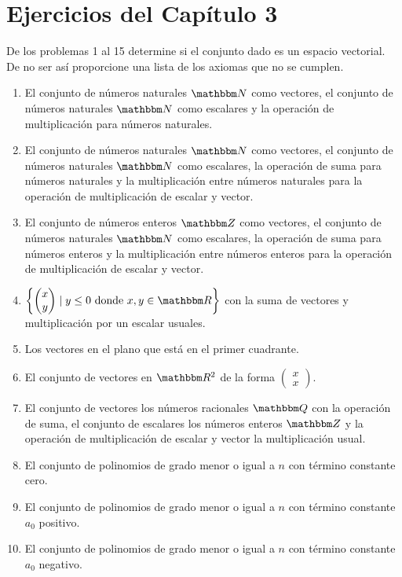 \newpage

\section{Ejercicios del Capítulo 3}

\noindent
De los problemas 1 al 15 determine si el conjunto dado es un espacio vectorial. De no ser así proporcione una lista de los axiomas que no se cumplen.
\begin{enumerate}
    \item El conjunto de números naturales $\NN$ como vectores, el conjunto de números naturales $\NN$ como escalares y la operación de multiplicación para números naturales.
    \item El conjunto de números naturales $\NN$ como vectores, el conjunto de números naturales $\NN$ como escalares, la operación de suma para números naturales y la multiplicación entre números naturales para la operación de multiplicación de escalar y vector.
    \item El conjunto de números enteros $\ZZ$ como vectores, el conjunto de números naturales $\NN$ como escalares, la operación de suma para números enteros y la multiplicación entre números enteros para la operación de multiplicación de escalar y vector.
    \item $\left\{ \begin{pmatrix} x \\ y \end{pmatrix} \mid y \leq 0 \text{ donde } x, y \in \RR \right\}$ con la suma de vectores y multiplicación por un escalar usuales.
    \item Los vectores en el plano que está en el primer cuadrante.
    \item El conjunto de vectores en $\RR[2]$ de la forma $\begin{pmatrix} x \\ x \end{pmatrix}$.
    \item El conjunto de vectores los números racionales $\QQ$ con la operación de suma, el conjunto de escalares los números enteros $\ZZ$ y la operación de multiplicación de escalar y vector la multiplicación usual.
    \item El conjunto de polinomios de grado menor o igual a $n$ con término constante cero.
    \item El conjunto de polinomios de grado menor o igual a $n$ con término constante $a_{0}$ positivo.
    \item El conjunto de polinomios de grado menor o igual a $n$ con término constante $a_{0}$ negativo.

\end{enumerate}
